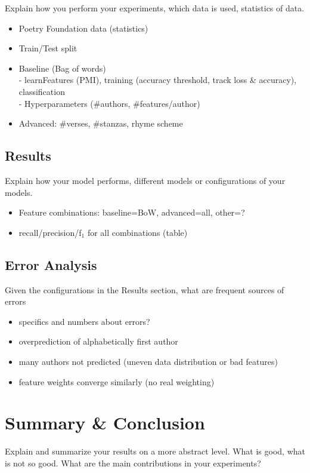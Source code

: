\documentclass[11pt]{article}
\begin{document}
Explain how you perform your experiments, which data is used, statistics of data.
\begin{itemize}
\item Poetry Foundation data (statistics)
\item Train/Test split
\item Baseline (Bag of words)\\- learnFeatures (PMI), training (accuracy threshold, track loss \& accuracy), classification\\- Hyperparameters (\#{}authors, \#{}features/author)
\item Advanced: \#{}verses, \#{}stanzas, rhyme scheme
\end{itemize}

\subsection{Results}

Explain how your model performs, different models or configurations of your models.
\begin{itemize}
\item Feature combinations: baseline=BoW, advanced=all, other=?
\item recall/precision/f$_1$ for all combinations (table)
\end{itemize}

\subsection{Error Analysis}

Given the configurations in the Results section, what are frequent sources of errors
\begin{itemize}
\item specifics and numbers about errors?
\item overprediction of alphabetically first author
\item many authors not predicted (uneven data distribution or bad features)
\item feature weights converge similarly (no real weighting)
\end{itemize}

\section{Summary \& Conclusion}

Explain and summarize your results on a more abstract level. What is good, what is not so
good. What are the main contributions in your experiments?
\end{document}
